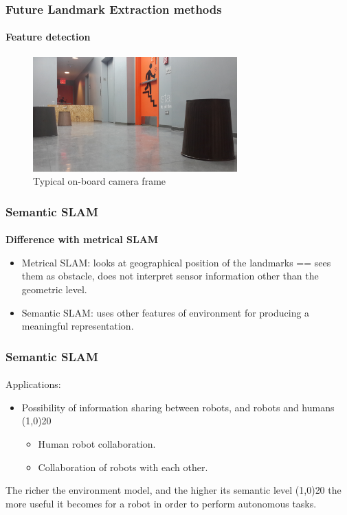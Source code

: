 \documentclass{beamer}
\begin{document}
		\begin{frame}
			\frametitle{Future Landmark Extraction methods}
			\framesubtitle{Feature detection}
			\begin{figure}
				\centering
				\includegraphics[width=0.7\textwidth,height=0.7\textheight]{onboard}
				\caption{Typical on-board camera frame}
			\end{figure}

		\end{frame}





	\begin{frame}
		\frametitle{Semantic SLAM}
		
		\framesubtitle{}
		\textbf{Difference with metrical SLAM}
		\begin{itemize}
			\item Metrical SLAM: looks at geographical position of the landmarks == sees them as obstacle, does not interpret sensor information other than the geometric level.
			\item Semantic SLAM: uses other features of environment for producing a meaningful representation.
		\end{itemize}

	\end{frame}






	\begin{frame}
		\frametitle{Semantic SLAM}
		
		\framesubtitle{}

		 Applications:
			\begin{itemize}
				\item Possibility of information sharing between robots, and robots and humans  \thicklines \vector(1,0){20}
				\begin{itemize}
					\item Human robot collaboration.
					\item Collaboration of robots with each other.
				\end{itemize} 
			\end{itemize}

		The richer the environment model, and the higher its semantic level \thicklines \vector(1,0){20} the more useful it becomes for a robot in order to perform autonomous tasks.


	\end{frame}
\end{document}
